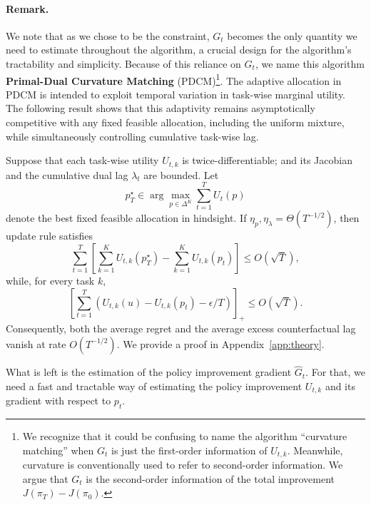\paragraph{Remark.} We note that as we chose  to be the constraint, $G_t$ becomes the only quantity we need to estimate throughout the algorithm, a crucial design for the algorithm's tractability and simplicity. Because of this reliance on $G_t$, we name this algorithm \textbf{Primal-Dual Curvature Matching} (PDCM)\footnote{We recognize that it could be confusing to name the algorithm ``curvature matching'' when $G_t$ is just the first-order information of $U_{t, k}$. Meanwhile, curvature is conventionally used to refer to second-order information. We argue that $G_t$ is the second-order information of the total improvement $J(\pi_{T}) - J(\pi_0)$.}. The adaptive allocation in PDCM is intended to exploit temporal variation in task-wise marginal utility. The following result shows that this adaptivity remains asymptotically competitive with any fixed feasible allocation, including the uniform mixture, while simultaneously controlling cumulative task-wise lag.



\begin{theorem}
\label{thm:pdcm_no_regret}
Suppose that each task-wise utility $U_{t,k}$ is twice-differentiable; and its Jacobian and the cumulative dual lag $\lambda_t$ are bounded. Let
\[
p_T^\star
\in
\arg\max_{p\in \Delta^K}
\sum_{t=1}^T U_t(p)
\]
denote the best fixed feasible allocation in hindsight. If
$\eta_p,\eta_\lambda=\Theta(T^{-1/2})$, then update rule  satisfies
\begin{equation}
\sum_{t=1}^T
\left[
\sum_{k=1}^K U_{t,k}(p_T^\star) - \sum_{k=1}^K U_{t,k}(p_t)
\right]
\leq
O(\sqrt{T}),
\end{equation}
while, for every task $k$,
\begin{equation}
\left[
\sum_{t=1}^T
\left(
U_{t,k}(u)-U_{t,k}(p_t)-\epsilon / T
\right)
\right]_+
\leq
O(\sqrt{T}).
\end{equation}
Consequently, both the average regret and the average excess counterfactual lag vanish at rate $O(T^{-1/2})$. We provide a proof in Appendix~\ref{app:theory}.
\end{theorem}

What is left is the estimation of the policy improvement gradient $\hat{G}_t$. For that, we need a fast and tractable way of estimating the policy improvement $U_{t, k}$ and its gradient with respect to $p_t$.

